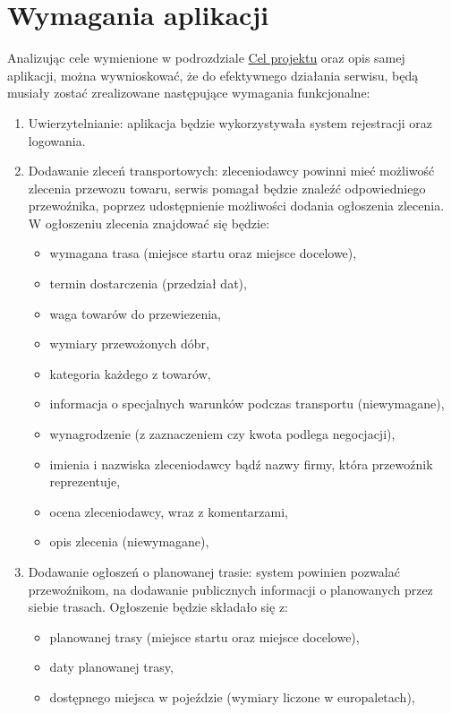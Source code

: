 \section{Wymagania aplikacji}
Analizując cele wymienione w podrozdziale \hyperref[sec:cele]{Cel projektu} oraz opis samej aplikacji, można wywnioskować, że do efektywnego działania serwisu, będą musiały zostać zrealizowane następujące wymagania funkcjonalne:
\begin{enumerate}
    \item Uwierzytelnianie: aplikacja będzie wykorzystywała system rejestracji oraz logowania.
    \item Dodawanie zleceń transportowych: zleceniodawcy powinni mieć możliwość zlecenia przewozu towaru, serwis pomagał będzie znaleźć odpowiedniego przewoźnika, poprzez udostępnienie możliwości dodania ogłoszenia zlecenia. W ogłoszeniu zlecenia znajdować się będzie:
    \begin{itemize}
        \item wymagana trasa (miejsce startu oraz miejsce docelowe),
        \item termin dostarczenia (przedział dat),
        \item waga towarów do przewiezenia,
        \item wymiary przewożonych dóbr,
        \item kategoria każdego z towarów,
        \item informacja o specjalnych warunków podczas transportu (niewymagane),
        \item wynagrodzenie (z zaznaczeniem czy kwota podlega negocjacji),
        \item imienia i nazwiska zleceniodawcy bądź nazwy firmy, która przewoźnik reprezentuje,
        \item ocena zleceniodawcy, wraz z komentarzami,
        \item opis zlecenia (niewymagane),
    \end{itemize}
    \item Dodawanie ogłoszeń o planowanej trasie: system powinien pozwalać przewoźnikom, na dodawanie publicznych informacji o planowanych przez siebie trasach. Ogłoszenie będzie składało się z:
    \begin{itemize}
        \item planowanej trasy (miejsce startu oraz miejsce docelowe),
        \item daty planowanej trasy,
        \item dostępnego miejsca w pojeździe (wymiary liczone w europaletach),

\end{itemize}
\end{enumerate}
